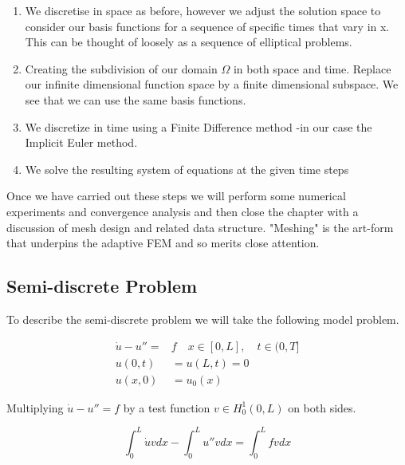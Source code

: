 \documentclass{uonmathreport}
\theoremstyle{definition}
\theoremstyle{problem}
\theoremstyle{theorem}
\begin{document}
\begin{enumerate}
\item We discretise in space as before, however we adjust the solution space to consider our basis functions for a sequence of specific times that vary in x. This can be thought of loosely as a sequence of elliptical problems.  

\item Creating the subdivision of our domain $\Omega$ in both space and time. Replace our infinite dimensional function space by a finite dimensional subspace. We see that we can use the same basis functions.

\item We discretize in time using a Finite Difference method -in our case the Implicit Euler method.


\item We solve the resulting system of equations at the given time steps
\end{enumerate}

Once we have carried out these steps we will perform some numerical experiments and convergence analysis and then close the chapter with a discussion of mesh design and related data structure. "Meshing" is the art-form that underpins the adaptive FEM and so merits close attention. 



\subsection{Semi-discrete Problem} \label{subsubsec:Semi-discreet}

To describe the semi-discrete problem we will take the following model problem. 


\begin{subequations} 
\begin{align}
  \dot{u} - u'' = & f \quad x \in [0, L], \quad t \in (0, T]  \\ \label{eq:Simple Heat}
  u(0, t) & = u(L, t) = 0\\
  u(x, 0) & = u_0(x)   
\end{align}
\end{subequations}

Multiplying $\dot{u} - u'' = f$ by a test function  $v \in H^1_0(0, L)$  on both sides. 

\begin{equation*}
  \int_0^L \dot{u} v dx  - \int_0^L  u'' v  dx =   \int_0^L  f v  dx   
\end{equation*}
\vspace{1mm}
\end{document}

